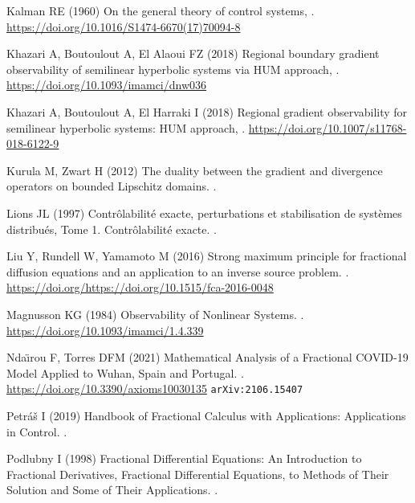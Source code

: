 \documentclass{article}
\begin{document}
\begin{thebibliography}{xx}
Kalman RE (1960)
\newblock On the general theory of control systems,
.
\url{https://doi.org/10.1016/S1474-6670(17)70094-8}

Khazari A, Boutoulout A, El Alaoui FZ (2018) 
\newblock Regional boundary gradient observability 
of semilinear hyperbolic systems via HUM approach, 
.
\url{https://doi.org/10.1093/imamci/dnw036}

Khazari A, Boutoulout A, El Harraki I (2018) 
\newblock Regional gradient observability 
for semilinear hyperbolic systems: HUM approach, 
. 
\url{https://doi.org/10.1007/s11768-018-6122-9}

Kurula M, Zwart H (2012)
\newblock The duality between the gradient and 
divergence operators on bounded Lipschitz domains.
.

Lions JL (1997) 
\newblock Contr\^{o}labilit\'{e} exacte, perturbations et stabilisation 
de syst\`{e}mes distribu\'{e}s, Tome 1. Contr\^{o}labilit\'{e} exacte.
.

Liu Y, Rundell W, Yamamoto M (2016)
\newblock Strong maximum principle for fractional 
diffusion equations and an application to an inverse source problem.
. 
\url{https://doi.org/https://doi.org/10.1515/fca-2016-0048}

Magnusson KG (1984)
\newblock Observability of Nonlinear Systems. 
.
\url{https://doi.org/10.1093/imamci/1.4.339}

Nda\"{\i}rou F, Torres DFM (2021) 
\newblock Mathematical Analysis of a Fractional COVID-19 
Model Applied to Wuhan, Spain and Portugal.
.
\url{https://doi.org/10.3390/axioms10030135}
{\tt arXiv:2106.15407}

Petr\'{a}\v{s} I (2019) 
\newblock Handbook of Fractional Calculus with Applications: 
Applications in Control. 
.

Podlubny I (1998) 
\newblock Fractional Differential Equations: 
An Introduction to Fractional Derivatives, 
Fractional Differential Equations, 
to Methods of Their Solution and Some of Their Applications. 
.


\end{thebibliography}
\end{document}
